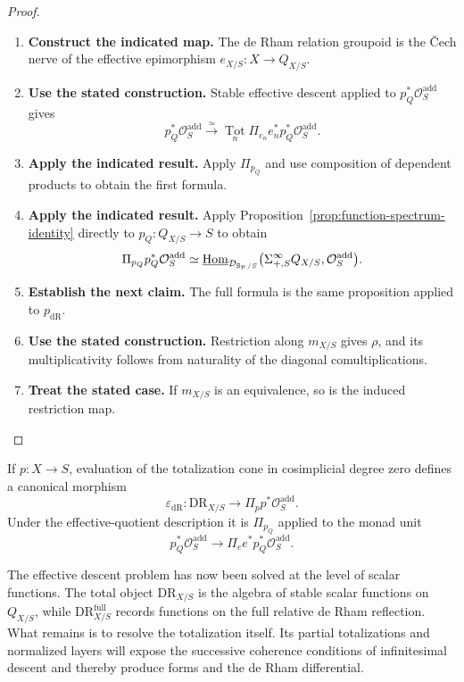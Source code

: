 \begin{proof}
\leavevmode
\begin{enumerate}[label=\textup{(\arabic*)}]
    \item \textbf{Construct the indicated map.}
    The de Rham relation groupoid is the \v{C}ech nerve of the effective epimorphism
    \(e_{X/S}:X\to Q_{X/S}\).
    \item \textbf{Use the stated construction.}
    Stable effective descent applied to
    \(p_Q^*\mathcal O_S^{\mathrm{add}}\) gives
    \[
    p_Q^*\mathcal O_S^{\mathrm{add}}
    \xrightarrow{\simeq}
    \operatorname*{Tot}_n
    \Pi_{e_n}e_n^*p_Q^*\mathcal O_S^{\mathrm{add}}.
    \]
    \item \textbf{Apply the indicated result.}
    Apply \(\Pi_{p_Q}\) and use composition of dependent products to obtain the first
    formula.
    \item \textbf{Apply the indicated result.}
    Apply Proposition~\ref{prop:function-spectrum-identity} directly to
    \(p_Q:Q_{X/S}\to S\) to obtain
    \[
    \Pi_{p_Q} p_Q^*\mathcal O_S^{\mathrm{add}}
    \simeq
    \underline{\operatorname{Hom}}_{\mathcal D_{\operatorname{Sp}/S}}
    \bigl(\Sigma^\infty_{+,S}Q_{X/S},\mathcal O_S^{\mathrm{add}}\bigr).
    \]
    \item \textbf{Establish the next claim.}
    The full formula is the same proposition applied to \(p_{\mathrm{dR}}\).
    \item \textbf{Use the stated construction.}
    Restriction along \(m_{X/S}\) gives \(\rho\), and its multiplicativity follows from
    naturality of the diagonal comultiplications.
    \item \textbf{Treat the stated case.}
    If \(m_{X/S}\) is an equivalence, so
    is the induced restriction map.
\end{enumerate}
\end{proof}


\begin{proposition}
\label{prop:de-Rham-augmentation-expanded}
If \(p:X\to S\), evaluation of the totalization cone in cosimplicial degree zero
defines a canonical morphism
\[
  \varepsilon_{\mathrm{dR}}:
  \mathrm{DR}_{X/S}
  \longrightarrow
  \Pi_pp^*\mathcal O_S^{\mathrm{add}}.
\]
Under the effective-quotient description it is \(\Pi_{p_Q}\) applied to the monad unit
\[
  p_Q^*\mathcal O_S^{\mathrm{add}}
  \longrightarrow
  \Pi_e e^*p_Q^*\mathcal O_S^{\mathrm{add}}.
\]
\end{proposition}


The effective descent problem has now been solved at the level of scalar
functions. The total object \(\mathrm{DR}_{X/S}\) is the algebra of stable
scalar functions on \(Q_{X/S}\), while
\(\mathrm{DR}^{\mathrm{full}}_{X/S}\) records functions on the full relative
de Rham reflection. What remains is to resolve the totalization itself.
Its partial totalizations and normalized layers will expose the successive
coherence conditions of infinitesimal descent and thereby produce forms and
the de Rham differential.
